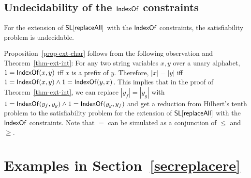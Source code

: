 %
%
%
%
%
%
%

\subsection{Undecidability of the $\mathsf{IndexOf}$ constraints}

\begin{proposition}\label{prop-indexof}
	For the extension of $\mathsf{SL}[\mathsf{replaceAll}]$ with the $\mathsf{IndexOf}$ constraints, the satisfiability problem is undecidable. 
\end{proposition}

Proposition~\ref{prop-ext-char} follows from the following observation and Theorem~\ref{thm-ext-int}: For any two string variables $x,y$ over a unary alphabet, 
$1= \mathsf{IndexOf}(x,y)$ iff $x$ is a prefix of $y$. Therefore, $|x| = |y|$ iff $1=  \mathsf{IndexOf}(x,y) \wedge 1= \mathsf{IndexOf}(y,x)$. This implies that in the proof of Theorem~\ref{thm-ext-int}, we can replace $|y_f| = |y_g|$ with $1=\mathsf{IndexOf}(y_f, y_g) \wedge 1 = \mathsf{IndexOf}(y_g, y_f)$ and get a reduction from Hilbert's tenth problem to the satisfiability problem for the extension of $\mathsf{SL}[\mathsf{replaceAll}]$ with the $\mathsf{IndexOf}$ constraints.
Note that $=$ can be simulated as a conjunction of $\leq$ and $\geq$.


%




\section{Examples in Section~\ref{secreplacere}}

